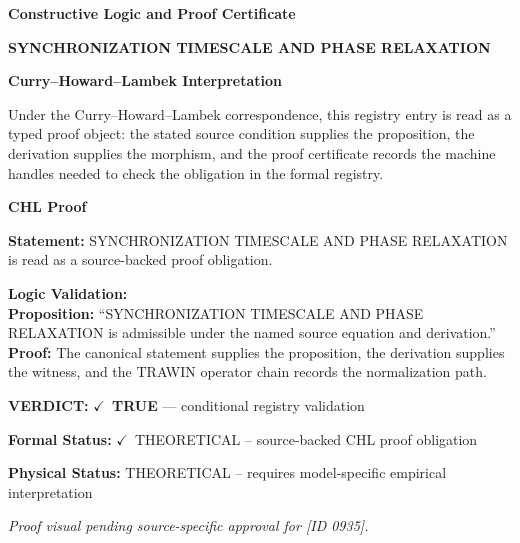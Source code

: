 \clearpage
\begingroup\tzpsupportsetup
\noindent\textbf{\fontsize{10.8pt}{12.8pt}\selectfont [ID 0935] Constructive Logic and Proof Certificate}\par
\noindent\textbf{\fontsize{10pt}{12pt}\selectfont SYNCHRONIZATION TIMESCALE AND PHASE RELAXATION}\par
\vspace{0.45em}
\begingroup
\footnotesize
\setlength{\parskip}{0.22em}
\setlength{\parindent}{0pt}
\noindent\textbf{Curry--Howard--Lambek Interpretation}\par
Under the Curry--Howard--Lambek correspondence, this registry entry is read as a typed proof
object: the stated source condition supplies the proposition, the derivation supplies the
morphism, and the proof certificate records the machine handles needed to check the obligation
in the formal registry.

\vspace{0.45em}
\noindent\textbf{CHL Proof}\par
\textbf{Statement:} SYNCHRONIZATION TIMESCALE AND PHASE RELAXATION is read as a source-backed proof obligation.

\textbf{Logic Validation:}\\
\textbf{Proposition:} ``SYNCHRONIZATION TIMESCALE AND PHASE RELAXATION is admissible under the named source equation and derivation.''\\
\textbf{Proof:} The canonical statement supplies the proposition, the derivation supplies the witness, and the TRAWIN operator chain records the normalization path.

\textbf{VERDICT:} \ensuremath{\checkmark}\ \textbf{TRUE} --- conditional registry validation

\textbf{Formal Status:} \ensuremath{\checkmark}\ THEORETICAL -- source-backed CHL proof obligation

\textbf{Physical Status:} THEORETICAL -- requires model-specific empirical interpretation
\par\vspace{0.45em}
\par
\vfill
\begingroup\footnotesize\itshape
Proof visual pending source-specific approval for [ID 0935].
\par\endgroup
\vfill
\endgroup
\endgroup
